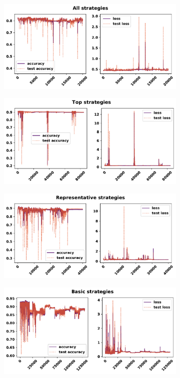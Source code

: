 \begin{figure}[!htbp]
    \begin{subfigure}{\textwidth}
    \centering
    \includegraphics[width=.8\textwidth]{src/chapters/07/img/validation_plot_all_strategies.pdf}
    \end{subfigure}\hfill
    \begin{subfigure}{\textwidth}
    \centering
    \includegraphics[width=.8\textwidth]{src/chapters/07/img/validation_plot_top_strategies.pdf}
    \end{subfigure}
    \begin{subfigure}{\textwidth}
    \centering
    \includegraphics[width=.8\textwidth]{src/chapters/07/img/validation_plot_representative_strategies.pdf}
    \end{subfigure}
    \begin{subfigure}{\textwidth}
    \centering
    \includegraphics[width=.8\textwidth]{src/chapters/07/img/validation_plot_basic_strategies.pdf}

\end{subfigure}
\end{figure}

